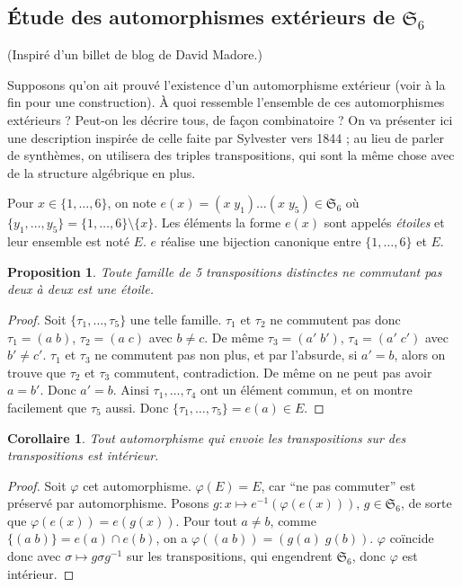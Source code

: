 \documentclass[a4paper, 11pt]{article}
\def\Sigmap{\mathfrak{S}}
\newtheorem*{proposition}{Proposition}
\newtheorem*{corollary}{Corollaire}
\begin{document}
\newpage


\subsection{Étude des automorphismes extérieurs de $\Sigmap_6$}

(Inspiré d'un billet de blog de David Madore.)

Supposons qu'on ait prouvé l'existence d'un automorphisme extérieur (voir à la
fin pour une construction). À quoi ressemble l'ensemble de ces automorphismes
extérieurs ? Peut-on les décrire tous, de façon combinatoire ? On va présenter
ici une description inspirée de celle faite par Sylvester vers 1844 ; au lieu de
parler de synthèmes, on utilisera des triples transpositions, qui sont la même
chose avec de la structure algébrique en plus.

Pour $x \in \{1, \ldots, 6\}$, on note $e(x) = (x\;y_1)\ldots(x\;y_5) \in
\Sigmap_6$ où $\{ y_1, \ldots, y_5 \} = \{1, \ldots, 6\}\setminus\{x\}$. Les
éléments la forme $e(x)$ sont appelés \emph{étoiles} et leur ensemble est noté
$E$. $e$ réalise une bijection canonique entre $\{1, \ldots, 6\}$ et $E$.

\begin{proposition}
  Toute famille de 5 transpositions distinctes ne commutant pas deux à deux est
  une étoile.
\end{proposition}
\begin{proof}
  Soit $\{\tau_1, \ldots, \tau_5\}$ une telle famille. $\tau_1$ et $\tau_2$ ne
  commutent pas donc $\tau_1 = (a\;b)$, $\tau_2 = (a\;c)$ avec $b \neq c$. De
  même $\tau_3 = (a'\;b')$, $\tau_4 = (a'\;c')$ avec $b' \neq c'$. $\tau_1$ et
  $\tau_3$ ne commutent pas non plus, et par l'absurde, si $a' = b$, alors on
  trouve que $\tau_2$ et $\tau_3$ commutent, contradiction. De même on ne peut
  pas avoir $a = b'$. Donc $a' = b$. Ainsi $\tau_1, \ldots, \tau_4$ ont un
  élément commun, et on montre facilement que $\tau_5$ aussi. Donc $\{\tau_1,
  \ldots, \tau_5\} = e(a) \in E$.
\end{proof}

\begin{corollary}
  Tout automorphisme qui envoie les transpositions sur des transpositions est
  intérieur.
\end{corollary}
\begin{proof}
  Soit $\varphi$ cet automorphisme. $\varphi(E) = E$, car \enquote{ne pas commuter}
  est préservé par automorphisme. Posons $g : x \mapsto e^{-1}(\varphi(e(x)))$, $g
  \in \Sigmap_6$, de sorte que $\varphi(e(x)) = e(g(x))$. Pour tout $a \neq b$,
  comme $\{(a\;b)\} = e(a) \cap e(b)$, on a $\varphi((a\;b)) = (g(a)\;g(b))$.
  $\varphi$ coïncide donc avec $\sigma \mapsto g\sigma g^{-1}$ sur les
  transpositions, qui engendrent $\Sigmap_6$, donc $\varphi$ est intérieur.
\end{proof}
\end{document}
